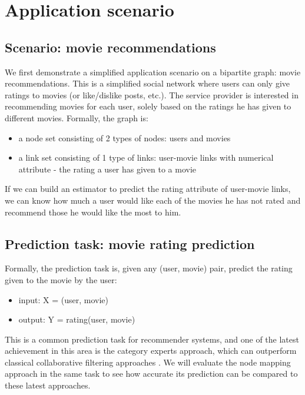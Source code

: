 \documentclass{article}
\begin{document}
\section{Application scenario}

\subsection{Scenario: movie recommendations}
We first demonstrate a simplified application scenario on a bipartite graph: 
movie recommendations.
This is a simplified social network where users can only give ratings to movies 
(or like/dislike posts, etc.).
The service provider is interested in recommending movies for each user, solely 
based on the ratings he has given to different movies.
Formally, the graph is:
\begin{itemize}
	\item a node set consisting of 2 types of nodes: users and movies
	\item a link set consisting of 1 type of links: user-movie links with 
	numerical attribute - the rating a user has given to a movie
\end{itemize}
If we can build an estimator to predict the rating attribute of user-movie 
links, we can know how much a user would like each of the movies he has not 
rated and recommend those he would like the most to him.

\subsection{Prediction task: movie rating prediction}
Formally, the prediction task is, given any (user, movie) pair, predict the 
rating given to the movie by the user:
\begin{itemize}
	\item input: X = (user, movie)
	\item output: Y = rating(user, movie)
\end{itemize}
This is a common prediction task for recommender systems,
and one of the latest achievement in this area is the category experts approach,
which can outperform classical collaborative filtering approaches 
\cite{hwang2016efficient}.
We will evaluate the node mapping approach in the same task to see how accurate 
its prediction can be compared to these latest approaches.
\end{document}
